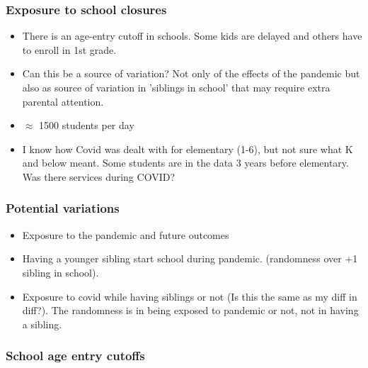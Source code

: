 \documentclass{beamer}
\begin{document}
\begin{frame}
    \label{update_scott}
    \frametitle{Exposure to school closures}
    \begin{itemize}
        \item There is an age-entry cutoff in schools. Some kids are delayed and others have to enroll in 1st grade.
        \item Can this be a source of variation? Not only of the effects of the pandemic but also as source of variation in 'siblings in school' that may require extra parental attention.
        \item $\approx$ 1500 students per day
        \item I know how Covid was dealt with for elementary (1-6), but not sure what K and below meant. Some students are in the data 3 years before elementary. Was there services during COVID?
    \end{itemize}
\end{frame}

\begin{frame}
    \label{update_scott}
    \frametitle{Potential variations}
    \begin{itemize}
        \item Exposure to the pandemic and future outcomes
        \item Having a younger sibling start school during pandemic. (randomness over +1 sibling in school).
        \item Exposure to covid while having siblings or not (Is this the same as my diff in diff?). The randomness is in being exposed to pandemic or not, not in having a sibling.
    \end{itemize}
\end{frame}

\begin{frame}
    \label{update_scott}
    \frametitle{School age entry cutoffs}
 {
    }
\end{frame}
\end{document}
